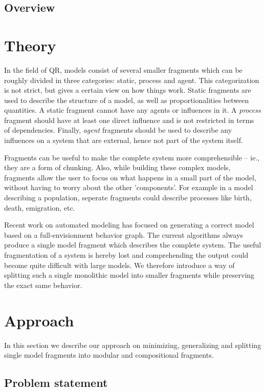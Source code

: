 \documentclass{article}
\begin{document}
\subsection{Overview}

\section{Theory}

In the field of QR, models %
consist of
several smaller fragments which can be roughly divided in three categories:
static, process and agent. This categorization is not strict, but gives
a certain view on how things work. Static fragments are used to describe the
structure of a model, as well as proportionalities between quantities. A static
fragment cannot have any agents or influences in it. A \emph{process} fragment
should have at least one direct influence and is not restricted in terms of dependencies. %
Finally, \emph{agent} fragments should be used to describe any influences on a
system that are external, hence not part of the system itself.

Fragments can be useful to make the complete system more comprehensible -- ie., they are a form of chunking. 
Also, while building these complex models, fragments allow the user to focus on
what happens in a small part of the model, without having to worry about the
other 'components'. For example in a model describing a population, seperate
fragments could describe processes like birth, death, emigration, etc.

Recent work on automated modeling \cite{buisman, liem, vanweelden} has focused
on generating a correct model based on a full-envisionment behavior graph. The
current algorithms always produce a single model fragment which describes the
complete system. The useful fragmentation of a system is hereby lost and
comprehending the output could become quite difficult with large models. We
therefore introduce a way of splitting such a single monolithic model into
smaller fragments while preserving the exact same behavior.

\section{Approach}
In this section we describe our approach on minimizing, generalizing and
splitting single model fragments into modular and compositional fragments.

\subsection{Problem statement}
\end{document}
